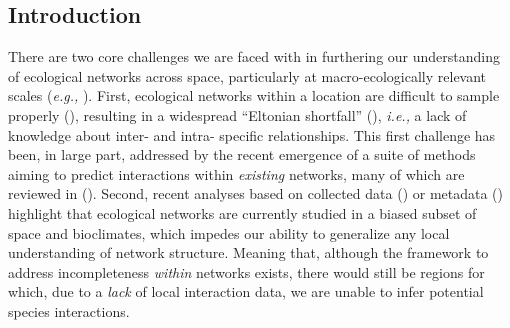 \begin{refsection}

\section{Introduction}

There are two core challenges we are faced with in furthering our
understanding of ecological networks across space, particularly at
macro-ecologically relevant scales (\emph{e.g.,} \cite{Trojelsgaard2016EcoNet}).
First, ecological networks within a location are difficult to sample
properly (\cite{Jordano2016ChaEco, Jordano2016SamNet}), resulting in a
widespread ``Eltonian shortfall'' (\cite{Hortal2015Seven}), \emph{i.e.,} a
lack of knowledge about inter- and intra- specific relationships. This
first challenge has been, in large part, addressed by the recent
emergence of a suite of methods aiming to predict interactions within
\emph{existing} networks, many of which are reviewed in
(\cite{Strydom2021Roadmap}). Second, recent analyses based on collected data
(\cite{Poisot2021GloKno}) or metadata (\cite{Cameron2019Uneven}) highlight
that ecological networks are currently studied in a biased subset of
space and bioclimates, which impedes our ability to generalize any local
understanding of network structure. Meaning that, although the framework
to address incompleteness \emph{within} networks exists, there would
still be regions for which, due to a \emph{lack} of local interaction
data, we are unable to infer potential species interactions.


\end{refsection}

